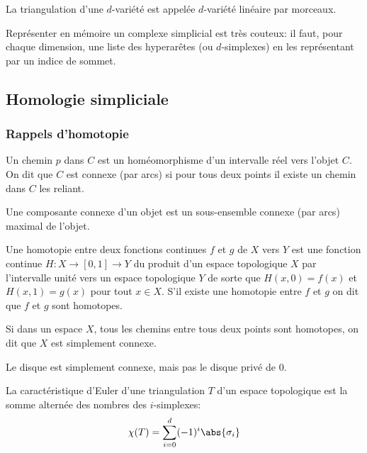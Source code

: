 \begin{definition}
	La triangulation d'une $d$-variété est appelée $d$-variété linéaire par morceaux.
\end{definition}

Représenter en mémoire un complexe simplicial est très couteux: il faut, pour chaque dimension, une liste des hyperarêtes (ou $d$-simplexes) en les représentant par un indice de sommet.

\subsection{Homologie simpliciale}
\subsubsection{Rappels d'homotopie}
\begin{definition}
	Un chemin $p$ dans $C$ est un homéomorphisme d'un intervalle réel vers l'objet $C$.
	On dit que $C$ est connexe (par arcs) si pour tous deux points il existe un chemin dans $C$ les reliant.
\end{definition}

\begin{definition}
	Une composante connexe d'un objet est un sous-ensemble connexe (par arcs) maximal de l'objet.
\end{definition}

\begin{definition}
	Une homotopie entre deux fonctions continues $f$ et $g$ de $X$ vers $Y$ est une fonction continue $H: X \to  [0, 1] \to Y$ du produit d'un espace topologique $X$ par l'intervalle unité vers un espace topologique $Y$ de sorte que $H(x, 0) = f(x)$ et $H(x, 1) = g(x)$ pour tout $x \in X$.
	S'il existe une homotopie entre $f$ et $g$ on dit que $f$ et $g$ sont homotopes.
\end{definition}

\begin{definition}
	Si dans un espace $X$, tous les chemins entre tous deux points sont homotopes, on dit que $X$ est simplement connexe.
\end{definition}
Le disque est simplement connexe, mais pas le disque privé de $0$.

\begin{definition}
	La caractéristique d'Euler d'une triangulation $T$ d'un espace topologique est la somme alternée des nombres des $i$-simplexes:
	\begin{equation*}
		\chi(T) = \sum_{i=0}^{d} (-1)^{i}\abs{\sigma_{i}}
	\end{equation*}
\end{definition}


